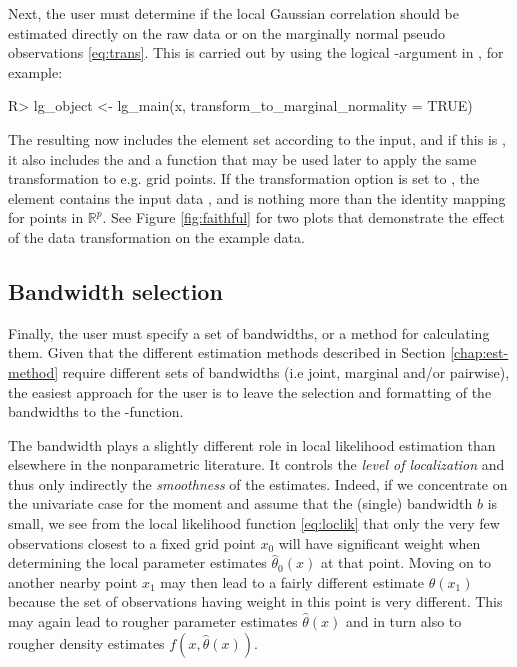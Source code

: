 Next, the user must determine if the local Gaussian correlation should be estimated directly on the raw data or on the marginally normal pseudo observations \eqref{eq:trans}. This is carried out by using the logical -argument in , for example:

\begin{example}
R> lg_object <- lg_main(x, transform_to_marginal_normality = TRUE)
\end{example}

The resulting  now includes the element  set according to the input, and if this is , it also includes the  and a function  that may be used later to apply the same transformation to e.g. grid points. If the transformation option is set to , the  element contains the input data , and  is nothing more than the identity mapping for points in \(\mathbb{R}^p\). See Figure \ref{fig:faithful} for two plots that demonstrate the effect of the data transformation on the example data.

\subsection{Bandwidth selection}\label{chap:bw}

Finally, the user must specify a set of bandwidths, or a method for calculating them. Given that the different estimation methods described in Section \ref{chap:est-method} require different sets of bandwidths (i.e joint, marginal and/or pairwise), the easiest approach for the user is to leave the selection and formatting of the bandwidths to the -function.

The bandwidth plays a slightly different role in local likelihood estimation than elsewhere in the nonparametric literature. It controls the \emph{level of localization} and thus only indirectly the \emph{smoothness} of the estimates. Indeed, if we concentrate on the univariate case for the moment and assume that the (single) bandwidth \(b\) is small, we see from the local likelihood function \eqref{eq:loclik} that only the very few observations closest to a fixed grid point \(x_0\) will have significant weight when determining the
local parameter estimates \(\widehat\theta_0\left(x\right)\) at that point. Moving on to another nearby point \(x_1\) may then lead to a fairly different estimate \(\widehat\theta\left(x_1\right)\) because the set of observations having weight in this point is very different. This may again lead to rougher parameter estimates \(\widehat\theta\left(x\right)\) and in turn also to rougher density estimates \(f\left(x,\widehat\theta\left(x\right)\right)\).

